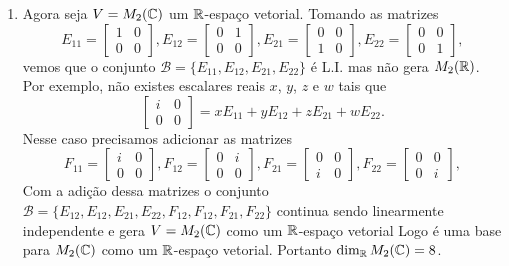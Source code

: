 \begin{exemplos}
\begin{enumerate}
    \item Agora seja $V = M_2(\mathbb{C})$ um $\mathbb{R}$-espaço vetorial. Tomando as matrizes
      \[
        E_{11} = \begin{bmatrix}1 & 0\\0 & 0\end{bmatrix},
        E_{12} = \begin{bmatrix}0 & 1\\0 & 0\end{bmatrix},
        E_{21} = \begin{bmatrix}0 & 0\\1 & 0\end{bmatrix},
        E_{22} = \begin{bmatrix}0 & 0\\0 & 1\end{bmatrix},
      \]
      vemos que o conjunto $\mathcal{B} = \{E_{11}, E_{12}, E_{21}, E_{22}\}$ é L.I. mas não gera $M_2(\mathbb{R})$. Por exemplo, não existes escalares reais $x$, $y$, $z$ e $w$ tais que
      \[
        \begin{bmatrix}i & 0 \\0 & 0\end{bmatrix} = xE_{11} + yE_{12} + zE_{21} + wE_{22}.
      \]
      Nesse caso precisamos adicionar as matrizes
      \[
        F_{11} = \begin{bmatrix}i & 0\\0 & 0\end{bmatrix},
        F_{12} = \begin{bmatrix}0 & i\\0 & 0\end{bmatrix},
        F_{21} = \begin{bmatrix}0 & 0\\i & 0\end{bmatrix},
        F_{22} = \begin{bmatrix}0 & 0\\0 & i\end{bmatrix},
      \]
      Com a adição dessa matrizes o conjunto $\mathcal{B} = \{E_{12}, E_{12}, E_{21}, E_{22}, F_{12}, F_{12}, F_{21}, F_{22}\}$ continua sendo linearmente independente e gera $V = M_2(\mathbb{C})$
      como um $\mathbb{R}$-espaço vetorial Logo é uma base para $M_2(\mathbb{C})$ como um $\mathbb{R}$-espaço vetorial. Portanto $\dim_{\mathbb{R}} M_2(\mathbb{C}) = 8$.


\end{enumerate}
\end{exemplos}
